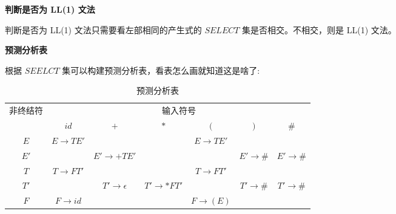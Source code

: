 \noindent\textbf{判断是否为 LL(1) 文法}

判断是否为 LL(1) 文法只需要看左部相同的产生式的 $SELECT$ 集是否相交。不相交，则是 LL(1) 文法。

\noindent\textbf{预测分析表}

根据 $SEELCT$ 集可以构建预测分析表，看表怎么画就知道这是啥了:

\begin{table}[H]
    \centering
    \caption{预测分析表}
    \label{table:预测分析表}
    \setlength{\tabcolsep}{3mm}
    \begin{tabular}{c|c|c|c|c|c|c}
        \toprule
        \multirow{2}{*}{非终结符} & \multicolumn{6}{c}{输入符号}                                                                                                                       \\ \cline{2-7}
                                  & $id$                         & $+$                       & $*$                   & $($                 & $)$                 & \#                  \\
        \midrule
        $E$                       & $E \rightarrow TE'$          &                           &                       & $E\rightarrow TE'$  &                     &                     \\
        $E'$                      &                              & $E' \rightarrow +TE'$     &                       &                     & $E' \rightarrow \#$ & $E' \rightarrow \#$ \\
        $T$                       & $T\rightarrow FT'$           &                           &                       & $T\rightarrow FT'$  &                     &                     \\
        $T'$                      &                              & $T' \rightarrow \epsilon$ & $T' \rightarrow *FT'$ &                     & $T' \rightarrow \#$ & $T' \rightarrow \#$ \\
        $F$                       & $F \rightarrow id$           &                           &                       & $F \rightarrow (E)$ &                     &                     \\
        \bottomrule
    \end{tabular}
\end{table}

